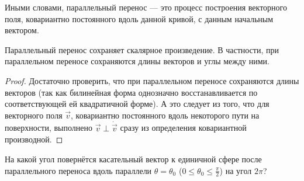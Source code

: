 Иными словами, параллельный перенос --- это процесс построения векторного поля, ковариантно постоянного вдоль данной кривой, с данным начальным вектором.

\begin{lemma}
	Параллельный перенос сохраняет скалярное произведение. В частности, при параллельном переносе сохраняются длины векторов и углы между ними.
\end{lemma}

\begin{proof}
	Достаточно проверить, что при параллельном переносе сохраняются длины векторов (так как билинейная форма однозначно восстанавливается по соответствующей ей квадратичной форме). А это следует из того, что для векторного поля $\vec{v}$, ковариантно постоянного вдоль некоторого пути на поверхности, выполнено $\vec{v} \perp \dot{\vec{v}}$ сразу из определения ковариантной производной.
\end{proof}

\begin{problem}
	На какой угол повернётся касательный вектор к единичной сфере после параллельного переноса вдоль параллели $\theta = \theta_0$ ($0 \leqslant \theta_0 \leqslant \frac{\pi}{2}$) на угол $2\pi$?
\end{problem}

